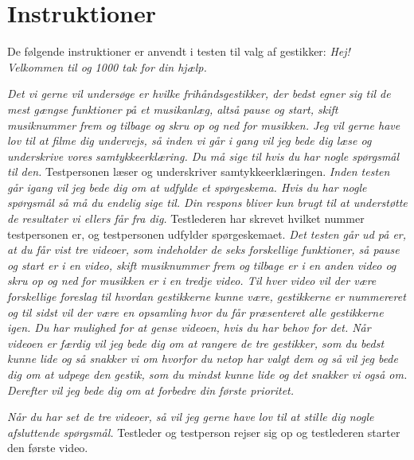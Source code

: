 \chapter{Instruktioner}
\label{app:InstruktionerValgAfGestikker}
%
De følgende instruktioner er anvendt i testen til valg af gestikker:\blankline
%
\textit{Hej! Velkommen til og 1000 tak for din hjælp.} 

\textit{Det vi gerne vil undersøge er hvilke frihåndsgestikker, der bedst egner sig til de mest gængse funktioner på et musikanlæg, altså pause og start, skift musiknummer frem og tilbage og skru op og ned for musikken. Jeg vil gerne have lov til at filme dig undervejs, så inden vi går i gang vil jeg bede dig læse og underskrive vores samtykkeerklæring. Du må sige til hvis du har nogle spørgsmål til den.}\blankline
%
Testpersonen læser og underskriver samtykkeerklæringen. \blankline
%  
\textit{Inden testen går igang vil jeg bede dig om at udfylde et spørgeskema. Hvis du har nogle spørgsmål så må du endelig sige til. Din respons bliver kun brugt til at understøtte de resultater vi ellers får fra dig.} \blankline
%
Testlederen har skrevet hvilket nummer testpersonen er, og testpersonen udfylder spørgeskemaet.\blankline
%  
\textit{Det testen går ud på er, at du får vist tre videoer, som indeholder de seks forskellige funktioner, så pause og start er i en video, skift musiknummer frem og tilbage er i en anden video og skru op og ned for musikken er i en tredje video. Til hver video vil der være forskellige foreslag til hvordan gestikkerne kunne være, gestikkerne er nummereret og til sidst vil der være en opsamling hvor du får præsenteret alle gestikkerne igen. Du har mulighed for at gense videoen, hvis du har behov for det. Når videoen er færdig vil jeg bede dig om at rangere de tre gestikker, som du bedst kunne lide og så snakker vi om hvorfor du netop har valgt dem og så vil jeg bede dig om at udpege den gestik, som du mindst kunne lide og det snakker vi også om. Derefter vil jeg bede dig om at forbedre din første prioritet.} 

\textit{Når du har set de tre videoer, så vil jeg gerne have lov til at stille dig nogle afsluttende spørgsmål.}\blankline
%
Testleder og testperson rejser sig op og testlederen starter den første video. 
% 
